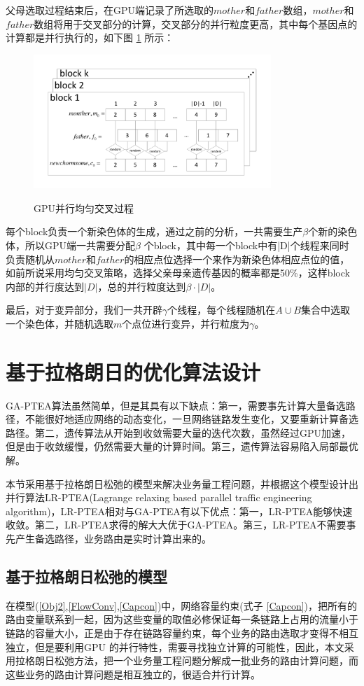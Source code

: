 父母选取过程结束后，在GPU端记录了所选取的$mother$和$father$数组，$mother$和$father$数组将用于交叉部分的计算，交叉部分的并行粒度更高，其中每个基因点的计算都是并行执行的，如下图 \ref{cross} 所示：
\begin{figure}
\setlength{\abovecaptionskip}{-0.5cm}
\begin{center}
{\includegraphics[width=0.8\textwidth]{figures/GPUcross.pdf}}
\end{center}
\caption{{\footnotesize{GPU并行均匀交叉过程}}}
\label{cross}
\end{figure}
每个block负责一个新染色体的生成，通过之前的分析，一共需要生产$\beta$个新的染色体，所以GPU端一共需要分配$\beta$ 个block，其中每一个block中有|D|个线程来同时负责随机从$mother$和$father$的相应点位选择一个来作为新染色体相应点位的值，如前所说采用均匀交叉策略，选择父亲母亲遗传基因的概率都是50\%，这样block内部的并行度达到$|D|$，总的并行粒度达到$\beta \cdot |D|$。

最后，对于变异部分，我们一共开辟$\gamma$个线程，每个线程随机在$A\cup B$集合中选取一个染色体，并随机选取$m$个点位进行变异，并行粒度为$\gamma$。
\section{基于拉格朗日的优化算法设计}

GA-PTEA算法虽然简单，但是其具有以下缺点：第一，需要事先计算大量备选路径，不能很好地适应网络的动态变化，一旦网络链路发生变化，又要重新计算备选路径。第二，遗传算法从开始到收敛需要大量的迭代次数，虽然经过GPU加速，但是由于收敛缓慢，仍然需要大量的计算时间。第三，遗传算法容易陷入局部最优解。

本节采用基于拉格朗日松弛的模型来解决业务量工程问题，并根据这个模型设计出并行算法LR-PTEA(Lagrange relaxing based parallel traffic engineering algorithm)，LR-PTEA相对与GA-PTEA有以下优点：第一，LR-PTEA能够快速收敛。第二，LR-PTEA求得的解大大优于GA-PTEA。第三，LR-PTEA不需要事先产生备选路径，业务路由是实时计算出来的。
\subsection{基于拉格朗日松弛的模型}
在模型(\ref{Obj2},\ref{FlowConv},\ref{Capcon})中，网络容量约束(式子 \ref{Capcon})，把所有的路由变量联系到一起，因为这些变量的取值必修保证每一条链路上占用的流量小于链路的容量大小，正是由于存在链路容量约束，每个业务的路由选取才变得不相互独立，但是要利用GPU 的并行特性，需要寻找独立计算的可能性，因此，本文采用拉格朗日松弛方法，把一个业务量工程问题分解成一批业务的路由计算问题，而这些业务的路由计算问题是相互独立的，很适合并行计算。


